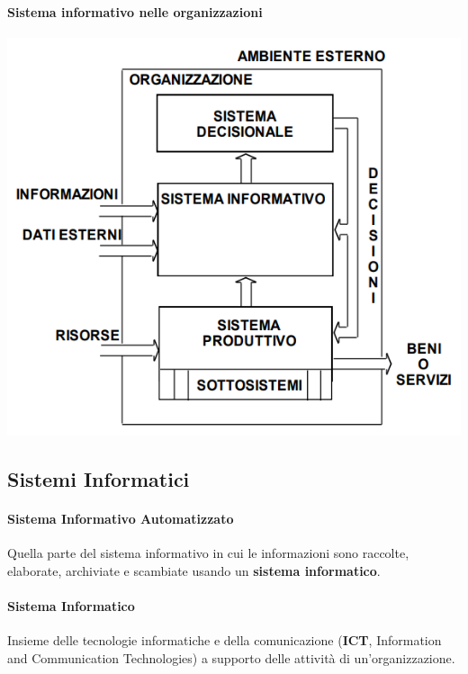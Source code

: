 \documentclass[10pt]{book}
\begin{document}
\paragraph{Sistema informativo nelle organizzazioni}
\begin{center}
	\includegraphics[scale=0.7]{sisinformativoorg.png}
\end{center}
\subsection{Sistemi Informatici}
\paragraph{Sistema Informativo Automatizzato} Quella parte del sistema informativo in cui le informazioni sono raccolte, elaborate, archiviate e scambiate usando un \textbf{sistema informatico}.
\paragraph{Sistema Informatico} Insieme delle tecnologie informatiche e della comunicazione (\textbf{ICT}, Information and Communication Technologies) a supporto delle attività di un'organizzazione.
\end{document}
